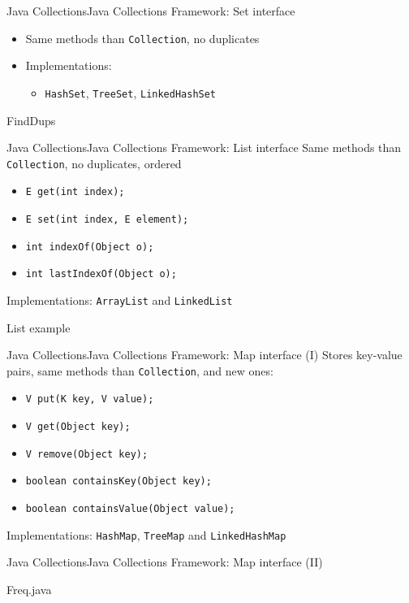 \documentclass[10pt,compress]{beamer} %
\begin{document}
\begin{frame}{Java Collections}{Java Collections Framework: Set interface}
	\begin{itemize}
	\item Same methods than \texttt{Collection}, no duplicates
	\item Implementations:
	\begin{itemize}
	\item \texttt{HashSet}, \texttt{TreeSet}, \texttt{LinkedHashSet}
	\end{itemize}
	\end{itemize}
	
	\vspace{-0.2cm}
	\begin{block}{FindDups}
	\vspace{-0.2cm}
		
	\vspace{-0.2cm}
	\end{block}

\end{frame}

\begin{frame}{Java Collections}{Java Collections Framework: List interface}
	Same methods than \texttt{Collection}, no duplicates, ordered
	\begin{itemize}
		\item \texttt{E get(int index);}
		\item \texttt{E set(int index, E element);}
		\item \texttt{int indexOf(Object o);}
		\item \texttt{int lastIndexOf(Object o);}
	\end{itemize}
	Implementations: \texttt{ArrayList} and \texttt{LinkedList}
	\begin{block}{List example}
	\vspace{-0.2cm}
		
	\vspace{-0.2cm}
	\end{block}
\end{frame}

\begin{frame}{Java Collections}{Java Collections Framework: Map interface (I)}
	Stores key-value pairs, same methods than \texttt{Collection}, and new ones:
	\begin{itemize}
		\item \texttt{V put(K key, V value);}
		\item \texttt{V get(Object key);}
		\item \texttt{V remove(Object key);}
		\item \texttt{boolean containsKey(Object key);}
		\item \texttt{boolean containsValue(Object value);}
	\end{itemize}
	Implementations: \texttt{HashMap}, \texttt{TreeMap} and \texttt{LinkedHashMap}
\end{frame}

\begin{frame}{Java Collections}{Java Collections Framework: Map interface (II)}
	\begin{block}{Freq.java}
	\vspace{-0.2cm}
		
	\vspace{-0.2cm}
	\end{block}
\end{frame}
\end{document}

